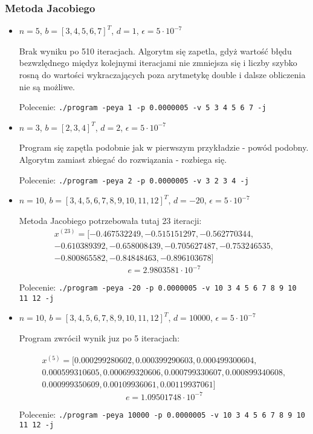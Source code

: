 \documentclass[a4paper,11pt]{article}
\begin{document}
\subsubsection{Metoda Jacobiego}
  \begin{itemize}
    \item $ n = 5 $, $ b = [3, 4, 5, 6, 7]^T$, $ d = 1 $, $ \epsilon = 5 \cdot 10^{-7} $
    
    Brak wyniku po 510 iteracjach. Algorytm się zapetla, gdyż wartość błędu bezwzlędnego międyz 
    kolejnymi iteracjami nie zmniejsza się i liczby szybko rosną do wartości wykraczających poza 
    arytmetykę double i dalsze obliczenia nie są możliwe.
    
    Polecenie: \texttt{./program -peya 1 -p 0.0000005 -v 5 3 4 5 6 7 -j}
    
    \item $ n = 3 $, $ b = [2, 3, 4]^T$, $ d = 2 $, $ \epsilon = 5 \cdot 10^{-7} $
    
      Program się zapętla podobnie jak w pierwszym przykładzie - powód podobny. 
      Algorytm zamiast zbiegać do rozwiązania - rozbiega się.
      
      Polecenie: \texttt{./program -peya 2 -p 0.0000005 -v 3 2 3 4 -j}
    
    \item $ n = 10 $, $ b = [3, 4, 5, 6, 7, 8, 9, 10, 11, 12]^T$, $ d = -20 $, $ \epsilon = 5 \cdot 10^{-7} $
    
    Metoda Jacobiego potrzebowała tutaj 23 iteracji:
      \begin{align*}
        x^{(23)} = [-0.467532249, -0.515151297, -0.562770344, \\ -0.610389392, -0.658008439, -0.705627487, -0.753246535, \\ -0.800865582, -0.84848463, -0.896103678]
      \end{align*}
      $$ e = 2.9803581 \cdot 10^{-7} $$
      
      Polecenie: \texttt{./program -peya -20 -p 0.0000005 -v 10 3 4 5 6 7 8 9 10 11 12 -j}
      
    \item $ n = 10 $, $ b = [3, 4, 5, 6, 7, 8, 9, 10, 11, 12]^T$, $ d = 10000 $, $ \epsilon = 5 \cdot 10^{-7} $
    
    Program zwrócił wynik juz po 5 iteracjach:
      
    \begin{align*}
        x^{(5)} = [0.000299280602, 0.000399290603, 0.000499300604, \\ 0.000599310605, 0.000699320606, 0.000799330607, 0.000899340608, \\ 0.000999350609, 0.00109936061, 0.00119937061]
      \end{align*}
      $$ e = 1.09501748 \cdot 10^{-7} $$
      
      Polecenie: \texttt{./program -peya 10000 -p 0.0000005 -v 10 3 4 5 6 7 8 9 10 11 12 -j} 
      
  \end{itemize}
\end{document}
